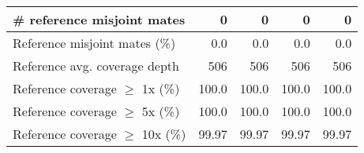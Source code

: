 \documentclass[12pt,a4paper]{article}
\begin{document}
\begin{table}[ht]
\begin{center}
\begin{tabular}{|l*{4}{|r}|}
\# reference misjoint mates & 0 & 0 & 0 & 0 \\ \hline
Reference misjoint mates (\%) & 0.0 & 0.0 & 0.0 & 0.0 \\ \hline
Reference avg. coverage depth & 506 & 506 & 506 & 506 \\ \hline
Reference coverage $\geq$ 1x (\%) & 100.0 & 100.0 & 100.0 & 100.0 \\ \hline
Reference coverage $\geq$ 5x (\%) & 100.0 & 100.0 & 100.0 & 100.0 \\ \hline
Reference coverage $\geq$ 10x (\%) & 99.97 & 99.97 & 99.97 & 99.97 \\ \hline
\end{tabular}
\end{center}
\end{table}
\end{document}
